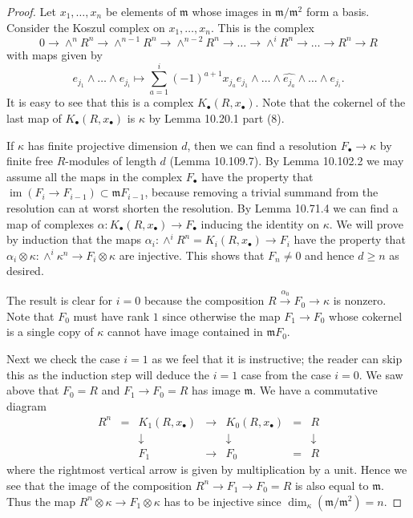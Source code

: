 \documentclass[UTF8,11pt]{ctexart}
\theoremstyle{definition}
\DeclareMathOperator{\im}{im}
\begin{document}
\begin{proof}
Let $x_1,\ldots,x_n$ be elements of $\mathfrak m$ whose images in $\mathfrak m/\mathfrak m^2$ form a basis. Consider the Koszul complex on $x_1,\ldots,x_n$. This is the complex
\[
0\to\wedge^nR^n\to\wedge^{n-1}R^n\to\wedge^{n-2}R^n\to\ldots\to\wedge^iR^n\to\ldots\to R^n\to R
\]
with maps given by
\[
e_{j_1}\wedge\ldots\wedge e_{j_i}\longmapsto
\sum_{a=1}^i(-1)^{a+1}x_{j_a}e_{j_1}\wedge\ldots\wedge\widehat{e_{j_a}}\wedge\ldots\wedge e_{j_i}.
\]
It is easy to see that this is a complex $K_\bullet(R,x_\bullet)$. Note that the cokernel of the last map of $K_\bullet(R,x_\bullet)$ is $\kappa$ by Lemma 10.20.1 part (8).

If $\kappa$ has finite projective dimension $d$, then we can find a resolution $F_\bullet\to\kappa$ by finite free $R$-modules of length $d$ (Lemma 10.109.7). By Lemma 10.102.2 we may assume all the maps in the complex $F_\bullet$ have the property that $\im(F_i\to F_{i-1})\subset\mathfrak mF_{i-1}$, because removing a trivial summand from the resolution can at worst shorten the resolution. By Lemma 10.71.4 we can find a map of complexes $\alpha:K_\bullet(R,x_\bullet)\to F_\bullet$ inducing the identity on $\kappa$. We will prove by induction that the maps $\alpha_i:\wedge^iR^n=K_i(R,x_\bullet)\to F_i$ have the property that $\alpha_i\otimes\kappa:\wedge^i\kappa^n\to F_i\otimes\kappa$ are injective. This shows that $F_n\ne0$ and hence $d\geq n$ as desired.

The result is clear for $i=0$ because the composition $R\xrightarrow{\alpha_0}F_0\to\kappa$ is nonzero. Note that $F_0$ must have rank $1$ since otherwise the map $F_1\to F_0$ whose cokernel is a single copy of $\kappa$ cannot have image contained in $\mathfrak mF_0$.

Next we check the case $i=1$ as we feel that it is instructive; the reader can skip this as the induction step will deduce the $i=1$ case from the case $i=0$. We saw above that $F_0=R$ and $F_1\to F_0=R$ has image $\mathfrak m$. We have a commutative diagram
\[
\begin{matrix}
R^n&=&K_1(R,x_\bullet)&\to&K_0(R,x_\bullet)&=&R\\
&&\downarrow&&\downarrow&&\downarrow\\
&&F_1&\to&F_0&=&R
\end{matrix}
\]
where the rightmost vertical arrow is given by multiplication by a unit. Hence we see that the image of the composition $R^n\to F_1\to F_0=R$ is also equal to $\mathfrak m$. Thus the map $R^n\otimes\kappa\to F_1\otimes\kappa$ has to be injective since $\dim_\kappa(\mathfrak m/\mathfrak m^2)=n$.


\end{proof}
\end{document}
